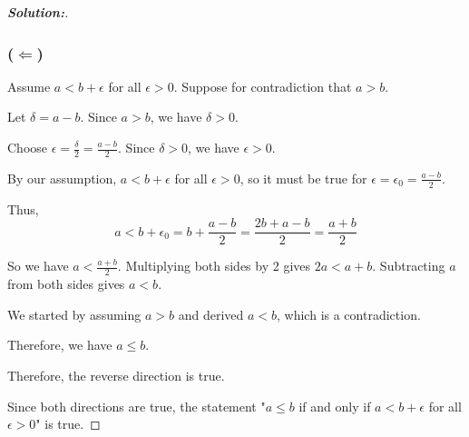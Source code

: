 \documentclass[12pt]{article}
\theoremstyle{definition}\newtheorem{problem}{Problem}
\newenvironment{solution}{\begin{proof}[\bfseries\textup{Solution:}]}{\end{proof}}
\begin{document}
\begin{solution}
\subsubsection*{($\Longleftarrow$)}
Assume $a<b+\epsilon$ for all $\epsilon>0$. Suppose for contradiction that $a > b$.

Let $\delta = a - b$. Since $a > b$, we have $\delta > 0$.

Choose $\epsilon = \frac{\delta}{2} = \frac{a-b}{2}$. Since $\delta > 0$, we have $\epsilon > 0$.

By our assumption, $a < b+\epsilon$ for all $\epsilon>0$, so it must be true for $\epsilon = \epsilon_0 = \frac{a-b}{2}$.

Thus, $$a < b + \epsilon_0 = b + \frac{a-b}{2} = \frac{2b + a - b}{2} = \frac{a+b}{2}$$

So we have $a < \frac{a+b}{2}$. Multiplying both sides by 2 gives $2a < a+b$. Subtracting $a$ from both sides gives $a < b$.

We started by assuming $a > b$ and derived $a < b$, which is a contradiction.

Therefore, we have $a \le b$.

Therefore, the reverse direction is true.

Since both directions are true, the statement "$a \le b$ if and only if $a<b+\epsilon$ for all $\epsilon>0$" is true.
\end{solution}
\end{document}
